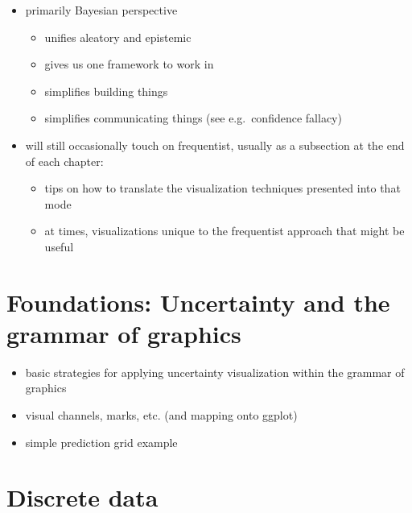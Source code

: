 \documentclass[]{book}
\providecommand{\tightlist}{%
  \setlength{\itemsep}{0pt}\setlength{\parskip}{0pt}}
\theoremstyle{definition}
\theoremstyle{definition}
\theoremstyle{definition}
\theoremstyle{remark}
\begin{document}
\begin{itemize}
\tightlist
\item
  primarily Bayesian perspective

  \begin{itemize}
  \tightlist
  \item
    unifies aleatory and epistemic
  \item
    gives us one framework to work in
  \item
    simplifies building things
  \item
    simplifies communicating things (see e.g.~confidence fallacy)
  \end{itemize}
\item
  will still occasionally touch on frequentist, usually as a subsection
  at the end of each chapter:

  \begin{itemize}
  \tightlist
  \item
    tips on how to translate the visualization techniques presented into
    that mode
  \item
    at times, visualizations unique to the frequentist approach that
    might be useful
  \end{itemize}
\end{itemize}

\chapter{Foundations: Uncertainty and the grammar of
graphics}\label{ch-vis-foundations}

\begin{itemize}
\tightlist
\item
  basic strategies for applying uncertainty visualization within the
  grammar of graphics
\item
  visual channels, marks, etc. (and mapping onto ggplot)
\item
  simple prediction grid example
\end{itemize}

\chapter{Discrete data}\label{ch-discrete}
\end{document}
